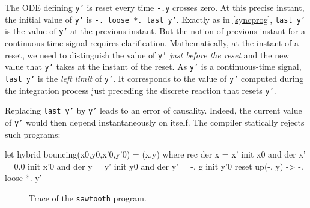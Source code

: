 \documentclass[11pt,titlepage,twoside]{report}
\makeatletter
\newcommand{\zls}[1]{{\@span{class="zelusinline"}#1}}
\newcommand{\zls}[1]{\texttt{#1}}
\renewcommand{\zls}[1]{\texttt{#1}}
\makeatother
\begin{document}
The ODE defining \zls{y'} is reset every time \zls{-.y} crosses zero.
At this precise instant, the initial value of \zls{y'} is \zls{-. loose *. 
last y'}.
Exactly as in \cref{syncprog}, \zls{last y'} is the value of \zls{y'} at the 
previous instant.
But the notion of previous instant for a continuous-time signal requires 
clarification.
Mathematically, at the instant of a reset, we need to distinguish the value 
of \zls{y'} \emph{just before the reset} and the new value that \zls{y'} 
takes at the instant of the reset.
As \zls{y'} is a continuous-time signal, \zls{last y'} is the \emph{left 
limit} of \zls{y'}.
It corresponds to the value of \zls{y'} computed during the integration 
process just preceding the discrete reaction that resets \zls{y'}.

Replacing \zls{last y'} by \zls{y'} leads to an error of causality.
Indeed, the current value of \zls{y'} would then depend instantaneously on 
itself.
The compiler statically rejects such programs:
\begin{chklisting}[include=gravity,fail,withresult]
let hybrid bouncing(x0,y0,x'0,y'0) = (x,y) where
 rec der x = x' init x0
 and der x' = 0.0 init x'0
 and der y = y' init y0
 and der y' = -. g init y'0 reset up(-. y) -> -. loose *. y'
\end{chklisting}

\begin{figure}
\centering %
\caption{Trace of the \zls{sawtooth} program.\label{sawtooth}}
\end{figure}
\end{document}
